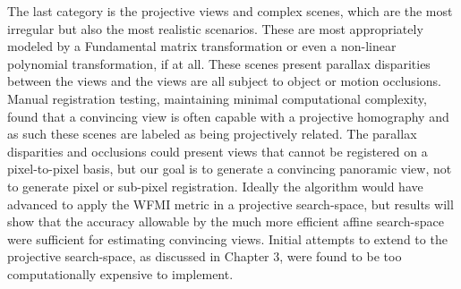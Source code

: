 The last category is the projective views and complex scenes, which are the most irregular but also the most realistic scenarios. These are most appropriately modeled by a Fundamental matrix transformation or even a non-linear polynomial transformation, if at all. These scenes present parallax disparities between the views and the views are all subject to object or motion occlusions. Manual registration testing, maintaining minimal computational complexity, found that a convincing view is often capable with a projective homography and as such these scenes are labeled as being projectively related. The parallax disparities and occlusions could present views that cannot be registered on a pixel-to-pixel basis, but our goal is to generate a convincing panoramic view, not to generate pixel or sub-pixel registration. Ideally the algorithm would have advanced to apply the WFMI metric in a projective search-space, but results will show that the accuracy allowable by the much more efficient affine search-space were sufficient for estimating convincing views. Initial attempts to extend to the projective search-space, as discussed in Chapter 3, were found to be too computationally expensive to implement.

